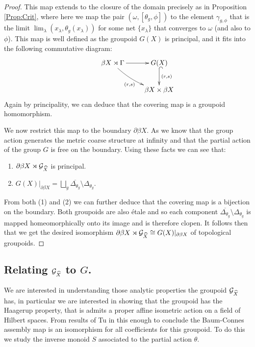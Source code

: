 \begin{proof}
This map extends to the closure of the domain precisely as in Proposition \ref{Prop:Crit}, where here we map the pair $(\omega,[\theta_{g},\phi])$ to the element $\gamma_{g,\phi}$ that is the limit $\lim_{\lambda}(x_{\lambda},\theta_{g}(x_{\lambda}))$ for some net $\lbrace x_{\lambda} \rbrace$ that converges to $\omega$ (and also to $\phi$). This map is well defined as the groupoid $G(X)$ is principal, and it fits into the following commutative diagram:
\begin{equation*}
\xymatrix{
& \beta X \rtimes \Gamma \ar@/_/[rd]_{(r,s)} \ar[r] & G(X) \ar@{^{(}->}[d]^{(r,s)}\\ & & \beta X \times \beta X
}
\end{equation*}
Again by principality, we can deduce that the covering map is a groupoid homomorphism.

We now restrict this map to the boundary $\partial\beta X$. As we know that the group action generates the metric coarse structure at infinity and that the partial action of the group $G$ is free on the boundary. Using these facts we can see that:
\begin{enumerate}
\item $\partial\beta X \rtimes \mathcal{G}_{\widehat{X}}$ is principal.
\item $G(X)|_{\partial\beta X} = \bigsqcup_{g}\overline{\Delta_{\theta_{g}}}\setminus \Delta_{\theta_{g}}$. 
\end{enumerate}
From both (1) and (2) we can further deduce that the covering map is a bijection on the boundary. Both groupoids are also \'etale and so each component $\overline{\Delta_{\theta_{g}}}\setminus \Delta_{\theta_{g}}$ is mapped homeomorphically onto its image and is therefore clopen. It follows then that we get the desired isomorphism $\partial\beta X \rtimes \mathcal{G}_{\widehat{X}} \cong G(X)|_{\partial\beta X}$ of topological groupoids. \end{proof}

\subsection{Relating $\mathcal{G}_{\widehat{X}}$ to $G$.}

We are interested in understanding those analytic properties the groupoid $\mathcal{G}_{\widehat{X}}$ has, in particular we are interested in showing that the groupoid has the Haagerup property, that is admits a proper affine isometric action on a field of Hilbert spaces. From results of Tu in \cite{MR1703305} this enough to conclude the Baum-Connes assembly map is an isomorphism for all coefficients for this groupoid. To do this we study the inverse monoid $S$ associated to the partial action $\theta$.

